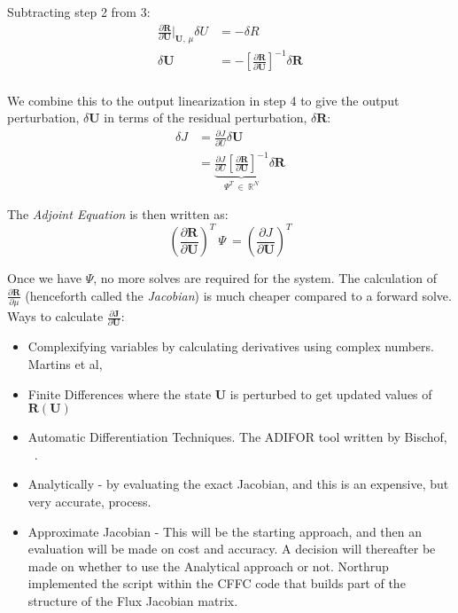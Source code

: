 Subtracting step 2 from 3:
\begin{equation}
\begin{split}
\frac{\partial \textbf{R}} {\partial \textbf{U}} \bigg|_{\textbf{U, $\mu$}} \delta U &= - \delta R \\
\delta \textbf{U} &= - \left[\frac{\partial \textbf{R}}{\partial \textbf{U}} \right]^{-1} \delta \textbf{R} \\
\end{split}
\end{equation}

We combine this to the output linearization in step 4 to give the output perturbation, $\delta \textbf{U}$ in terms of the residual perturbation, $\delta \textbf{R}$:
\begin{equation}
\begin{split}
\delta J &= \frac{\partial J}{\partial U} \delta \textbf{U} \\
& = \underbrace{\frac{\partial J}{\partial U} \left[\frac{\partial \textbf{R}}{\partial \textbf{U}} \right]^{-1}}_{\Psi^T ~\in~ \mathbb{R}^\textit{N}} \delta \textbf{R}
\end{split}
\end{equation}

The \textit{Adjoint Equation} is then written as:
\begin{equation}
\left( \frac{\partial \textbf{R}}{\partial \textbf{U}} \right)^T ~\Psi~ = \left(\frac{\partial J}{\partial \textbf{U}}\right)^T
\end{equation}

Once we have $\Psi$, no more solves are required for the system. The calculation of $\frac{\partial \textbf{R}}{\partial \textbf{$\mu$}}$ (henceforth called the \textit{Jacobian}) is much cheaper compared to a forward solve. Ways to calculate $\frac{\partial{\mathbf{J}}}{\partial{\mathbf{U}}}$:
\begin{itemize}
\item Complexifying variables by calculating derivatives using complex numbers. Martins et al, ~\cite{Martins:2003}
\item Finite Differences where the state $\mathbf{U}$ is perturbed to get updated values of $\mathbf{R}(\mathbf{U})$ 
\item Automatic Differentiation Techniques. The ADIFOR tool written by Bischof, ~\cite{Bischof94theadifor}.
\item Analytically - by evaluating the exact Jacobian, and this is an expensive, but very accurate, process.
\item Approximate Jacobian - This will be the starting approach, and then an evaluation will be made on cost and accuracy. A decision will thereafter be made on whether to use the Analytical approach or not. Northrup \cite{Northrup:2013} implemented the script within the CFFC code that builds part of the structure of the Flux Jacobian matrix.
\end{itemize}

